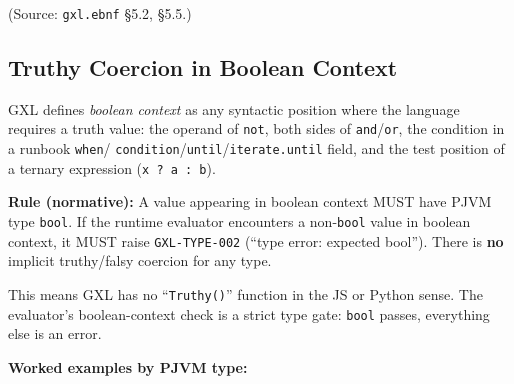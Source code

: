 (Source: \texttt{gxl.ebnf} \S5.2, \S5.5.)

\subsection{Truthy Coercion in Boolean Context}
\label{sec:gxl:semantics:truthy}

GXL defines \emph{boolean context} as any syntactic position where the
language requires a truth value: the operand of \texttt{not}, both sides
of \texttt{and}/\texttt{or}, the condition in a runbook \texttt{when}/
\texttt{condition}/\texttt{until}/\texttt{iterate.until} field, and the
test position of a ternary expression (\texttt{x ? a : b}).

\noindent\textbf{Rule (normative):}
A value appearing in boolean context MUST have PJVM type \texttt{bool}.
If the runtime evaluator encounters a non-\texttt{bool} value in boolean
context, it MUST raise \texttt{GXL-TYPE-002} (``type error: expected bool'').
There is \textbf{no} implicit truthy/falsy coercion for any type.

\noindent This means GXL has no ``\texttt{Truthy()}'' function in the
JS or Python sense.  The evaluator's boolean-context check is a strict
type gate: \texttt{bool} passes, everything else is an error.

\medskip
\noindent\textbf{Worked examples by PJVM type:}

